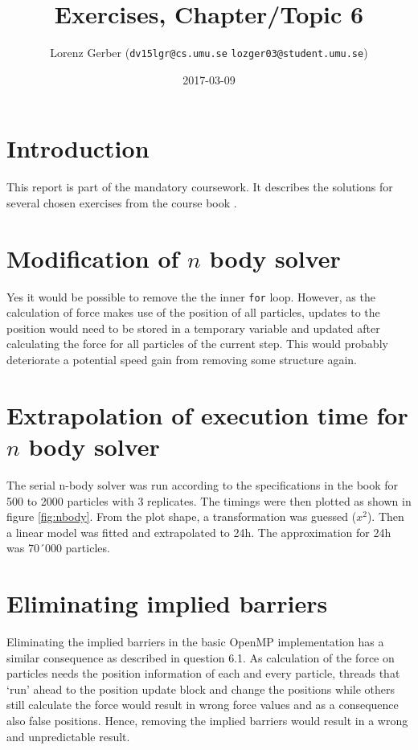 \documentclass[a4paper,11pt,twoside]{article}
\title{Exercises, Chapter/Topic 6}
\author{Lorenz Gerber ({\tt{dv15lgr@cs.umu.se}} {\tt{lozger03@student.umu.se}})}
\date{2017-03-09}
\begin{document}
\lstset{language=C}
\maketitle
\thispagestyle{empty}
\newpage
\tableofcontents
\thispagestyle{empty}
\newpage

\clearpage
{}

\section{Introduction}
This report is part of the mandatory coursework. It describes the solutions for several chosen exercises from the course book \cite{pacheco2011}.

\section{Modification of $n$ body solver}
Yes it would be possible to remove the the inner \verb+for+ loop. However, as the calculation of force makes use of the position of all particles, updates to the position would need to be stored in a temporary variable and updated after calculating the force for all particles of the current step. This would probably deteriorate a potential speed gain from removing some structure again.

\section{Extrapolation of execution time for $n$ body solver}
The serial n-body solver was run according to the specifications in the book for 500 to 2000 particles with 3 replicates. The timings were then plotted as shown in figure \ref{fig:nbody}. From the plot shape, a transformation was guessed ($x^2$). Then a linear model was fitted and extrapolated to 24h. The approximation for 24h was 70´000 particles.

\section{Eliminating implied barriers}
Eliminating the implied barriers in the basic OpenMP implementation has a similar consequence as described in question 6.1. As calculation of the force on particles needs the position information of each and every particle, threads that `run' ahead to the position update block and change the positions while others still calculate the force would result in wrong force values and as a consequence also false positions. Hence, removing the implied barriers would result in a wrong and unpredictable result.
  
\end{document}
